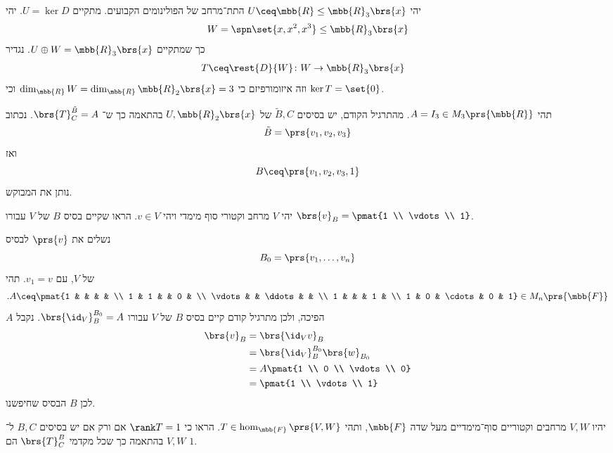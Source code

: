 \documentclass[a4paper,10pt,oneside,openany]{article}
\begin{document}
\begin{solution}
יהי
$U \ceq \mbb{R} \leq \mbb{R}_3\brs{x}$
התת־מרחב של הפולינומים הקבועים.
מתקיים
$U = \ker D$.
יהי
\[W = \spn\set{x, x^2, x^3} \leq \mbb{R}_3\brs{x}\]
כך שמתקיים
$U \oplus W = \mbb{R}_3\brs{x}$.
נגדיר
\begin{align*}
T \ceq \rest{D}{W} \colon W &\to \mbb{R}_3\brs{x}
\end{align*}
וזה איזומורפיזם כי
$\dim_{\mbb{R}} W = \dim_{\mbb{R}} \mbb{R}_2\brs{x} = 3$
וכי
$\ker T = \set{0}$.

תהי
$A = I_3 \in M_3\prs{\mbb{R}}$.
מהתרגיל הקודם, יש בסיסים
$\tilde{B}, C$
של
$U, \mbb{R}_2\brs{x}$
בהתאמה כך ש־%
$\brs{T}^{\tilde{B}}_C = A$.
נכתוב
\[\tilde{B} = \prs{v_1, v_2, v_3}\]
ואז
\[B \ceq \prs{v_1, v_2, v_3, 1}\]
נותן את המבוקש.
\end{solution}

\begin{exercise}
יהי
$V$
מרחב וקטורי סוף מימדי ויהי
$v \in V$.
הראו שקיים בסיס
$B$
של
$V$
עבורו
$\brs{v}_B = \pmat{1 \\ \vdots \\ 1}$.
\end{exercise}

\begin{solution}
נשלים את
$\prs{v}$
לבסיס
\[B_0 = \prs{v_1, \ldots, v_n}\]
של
$V$,
עם
$v_1 = v$.
תהי
\begin{align*}
\text{.} A \ceq \pmat{1 & & & & \\
1 & 1 & & 0 & \\
\vdots & & \ddots & & \\
1 & & & 1 & \\
1 & 0 & \cdots & 0 & 1} \in M_n\prs{\mbb{F}}
\end{align*}
$A$
הפיכה, ולכן מתרגיל קודם קיים בסיס
$B$
של
$V$
עבורו
$\brs{\id_V}^{B_0}_B = A$.
נקבל
\begin{align*}
\brs{v}_B &= \brs{\id_V v}_B
\\&=
\brs{\id_V}^{B_0}_{B} \brs{w}_{B_0}
\\&= A \pmat{1 \\ 0 \\ \vdots \\ 0}
\\&= \pmat{1 \\ \vdots \\ 1}
\end{align*}
לכן
$B$
הבסיס שחיפשנו.
\end{solution}

\begin{exercise}
יהיו
$V,W$
מרחבים וקטוריים סוף־מימדיים מעל שדה
$\mbb{F}$,
ותהי
$T \in \hom_{\mbb{F}}\prs{V,W}$.
הראו כי
$\rank T = 1$
אם ורק אם יש בסיסים
$B,C$
ל־%
$V,W$
בהתאמה כך שכל מקדמי
$\brs{T}^B_C$
הם
$1$.
\end{exercise}
\end{document}
